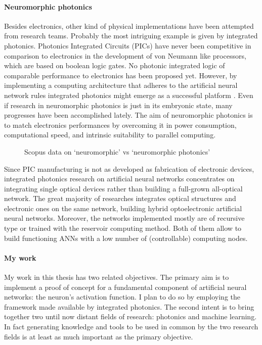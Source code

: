\paragraph{Neuromorphic photonics\\}
Besides electronics, other kind of physical implementations have been attempted from research teams.
Probably the most intriguing example is given by integrated photonics.
Photonics Integrated Circuits (PICs) have never been competitive in comparison to electronics in the development of von Neumann like processors, which are based on boolean logic gates.
No photonic integrated logic of comparable performance to electronics has been proposed yet.
However, by implementing a computing architecture that adheres to the artificial neural network rules integrated photonics might emerge as a successful platform \cite{de2017progress}.
Even if research in neuromorphic photonics is just in its embryonic state, many progresses have been accomplished lately.
The aim of neuromorphic photonics is to match electronics performances by overcoming it in power consumption, computational speed, and intrinsic suitability to parallel computing.

\begin{figure}[!htbp]
	\centering
	
	\caption{Scopus data on `neuromorphic' vs `neuromorphic photonics'}
	\label{fig:scopus}
\end{figure}

Since PIC manufacturing is not as developed as fabrication of electronic devices, integrated photonics research on artificial neural networks concentrates on integrating single optical devices rather than building a full-grown all-optical network.
The great majority of researches integrates optical structures and electronic ones on the same network, building hybrid optoelectronic artificial neural networks.
Moreover, the networks implemented mostly are of recursive type or trained with the reservoir computing method.
Both of them allow to build functioning ANNs with a low number of (controllable) computing nodes.

\paragraph{My work\\}
My work in this thesis has two related objectives.
The primary aim is to implement a proof of concept for a fundamental component of artificial neural networks: the neuron's activation function.
I plan to do so by employing the framework made available by integrated photonics.
The second intent is to bring together two until now distant fields of research: %
photonics and machine learning.
In fact generating knowledge and tools to be used in common by the two research fields is at least as much important as the primary objective.

